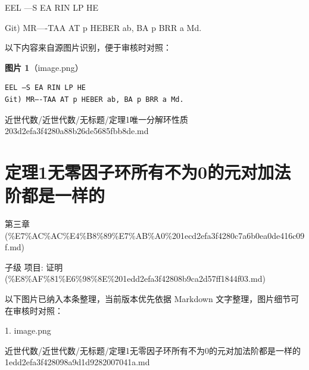 \begin{theorem}[定理1唯一分解环性质]

EEL —S EA RIN LP HE

Git) MR—-TAA AT p HEBER ab, BA p BRR a Md.

\end{theorem}

\begin{note}
以下内容来自源图片识别，便于审核时对照：

\textbf{图片 1}（image.png）
\begin{Verbatim}[fontsize=\small]
EEL —S EA RIN LP HE
Git) MR—-TAA AT p HEBER ab, BA p BRR a Md.
\end{Verbatim}

\end{note}

\begin{note}[来源路径]

近世代数/近世代数/无标题/定理1唯一分解环性质 203d2efa3f4280a88b26de5685fbb8de.md

\end{note}

\section*{定理1无零因子环所有不为0的元对加法阶都是一样的}

\begin{note}[来源上级主题]

第三章 (\%E7\%AC\%AC\%E4\%B8\%89\%E7\%AB\%A0\%201ecd2efa3f4280c7a6b0ea0de416c09f.md)

\end{note}

\begin{theorem}

子级 项目: 证明 (\%E8\%AF\%81\%E6\%98\%8E\%201edd2efa3f42808b9ca2d57ff1844f03.md)

\end{theorem}

\begin{note}[关联图片]
以下图片已纳入本条整理，当前版本优先依据 Markdown 文字整理，图片细节可在审核时对照：

1. image.png\\

\end{note}

\begin{note}[来源路径]

近世代数/近世代数/无标题/定理1无零因子环所有不为0的元对加法阶都是一样的 1edd2efa3f428098a9d1d9282007041a.md

\end{note}

